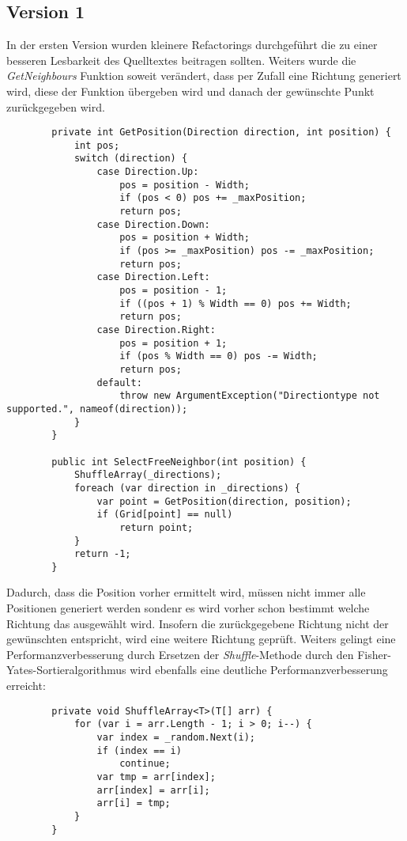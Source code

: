 \documentclass[a4paper,ngerman]{scrartcl}
\begin{document}
\subsection{Version 1}
In der ersten Version wurden kleinere Refactorings durchgeführt die zu einer besseren Lesbarkeit des Quelltextes beitragen sollten. Weiters wurde die \textit{GetNeighbours} Funktion soweit verändert, dass per Zufall eine Richtung generiert wird, diese der Funktion übergeben wird und danach der gewünschte Punkt zurückgegeben wird.

	\begin{lstlisting}
        private int GetPosition(Direction direction, int position) {
            int pos;
            switch (direction) {
                case Direction.Up:
                    pos = position - Width;
                    if (pos < 0) pos += _maxPosition;
                    return pos;
                case Direction.Down:
                    pos = position + Width;
                    if (pos >= _maxPosition) pos -= _maxPosition;
                    return pos;
                case Direction.Left:
                    pos = position - 1;
                    if ((pos + 1) % Width == 0) pos += Width;
                    return pos;
                case Direction.Right:
                    pos = position + 1;
                    if (pos % Width == 0) pos -= Width;
                    return pos;
                default:
                    throw new ArgumentException("Directiontype not supported.", nameof(direction));
            }
        }
				
        public int SelectFreeNeighbor(int position) {
            ShuffleArray(_directions);
            foreach (var direction in _directions) {
                var point = GetPosition(direction, position);
                if (Grid[point] == null)
                    return point;
            }
            return -1;
        }
	\end{lstlisting}

 Dadurch, dass die Position vorher ermittelt wird, müssen nicht immer alle Positionen generiert werden sondenr es wird vorher schon bestimmt welche Richtung das ausgewählt wird. Insofern die zurückgegebene Richtung nicht der gewünschten entspricht, wird eine weitere Richtung geprüft.
Weiters gelingt eine Performanzverbesserung durch Ersetzen der \textit{Shuffle}-Methode durch den Fisher-Yates-Sortieralgorithmus wird ebenfalls eine deutliche Performanzverbesserung erreicht:

	\begin{lstlisting}
        private void ShuffleArray<T>(T[] arr) {
            for (var i = arr.Length - 1; i > 0; i--) {
                var index = _random.Next(i);
                if (index == i)
                    continue;
                var tmp = arr[index];
                arr[index] = arr[i];
                arr[i] = tmp;
            }
        }
	\end{lstlisting}
	
\end{document}
